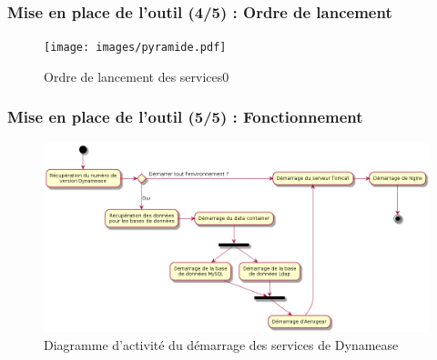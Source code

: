\begin{frame}
	\frametitle{Mise en place de l'outil (4/5) : Ordre de lancement}

    \begin{center}
	  \begin{figure}
        \texttt{[image: images/pyramide.pdf]}
	   \caption{Ordre de lancement des services0}
	  \end{figure}
	\end{center}
\end{frame}


\begin{frame}
	\frametitle{Mise en place de l'outil (5/5) : Fonctionnement}

    \begin{center}
	  \begin{figure}
        \includegraphics[scale=0.30]{images/activity_outil.png}
	   \caption{Diagramme d'activité du démarrage des services de Dynamease}
	  \end{figure}
	\end{center}

\end{frame}

